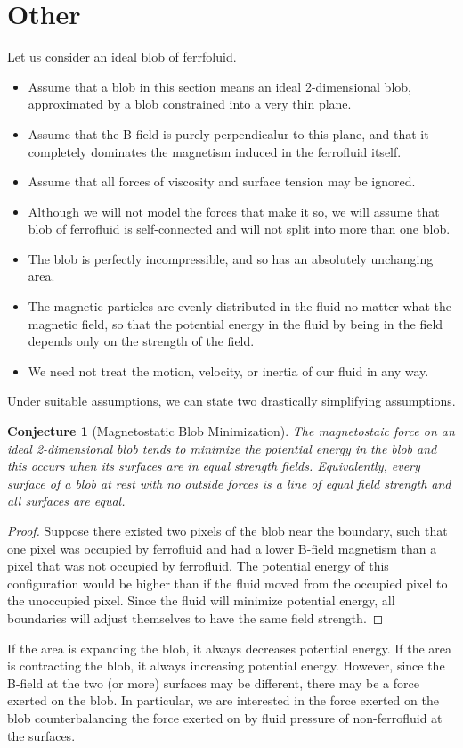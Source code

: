 \documentclass{asme2ej}
\newtheorem{conjecture}{Conjecture}
\begin{document}
\section{Other}


Let us consider an ideal blob of ferrfoluid.
\begin{itemize}
\item Assume that a blob in this section means an ideal 2-dimensional blob,
approximated by a blob constrained into a very thin plane.
\item Assume that the B-field is purely perpendicalur to this plane,
and that it completely dominates the magnetism induced in
the ferrofluid itself.
\item Assume that all forces of viscosity and surface tension may
  be ignored.
\item Although we will not model the forces that make it so,
  we will assume that blob of ferrofluid is self-connected and
  will not split into more than one blob.
\item The blob is perfectly incompressible, and so
  has an absolutely unchanging area.
\item The magnetic particles are evenly distributed in the
  fluid no matter what the magnetic field, so that the potential
  energy in the fluid by being in the field depends only on the
  strength of the field.
\item We need not treat the motion, velocity, or inertia of
  our fluid in any way.
\end{itemize}
Under suitable assumptions, we can state two drastically
simplifying assumptions.

\begin{conjecture}[Magnetostatic Blob Minimization]
  \label{conj:mbf}
  The magnetostaic force on an ideal 2-dimensional blob
  tends to minimize the potential energy in the blob
  and this occurs when its surfaces are in equal strength fields.
  Equivalently, every surface of a blob at rest with no outside
  forces is a line of equal field strength and all surfaces are equal.
\end{conjecture}

\begin{proof}
  Suppose there existed two pixels of the blob near the boundary,
  such that one pixel was occupied by ferrofluid and had a lower
  B-field magnetism than a pixel that was not occupied by ferrofluid.
  The potential energy of this configuration would be higher than
  if the fluid moved from the occupied pixel to the unoccupied pixel.
  Since the fluid will minimize potential energy, all boundaries
  will adjust themselves to have the same field strength.
  \end{proof}
If the area is expanding the blob, it always decreases potential
energy. If the area is contracting the blob, it always increasing
potential energy. However, since the B-field at the two (or more)
surfaces may be different, there may be a force exerted on the
blob. In particular, we are interested in the force exerted on
the blob counterbalancing the force exerted on by fluid pressure
of non-ferrofluid at the surfaces.
\end{document}

